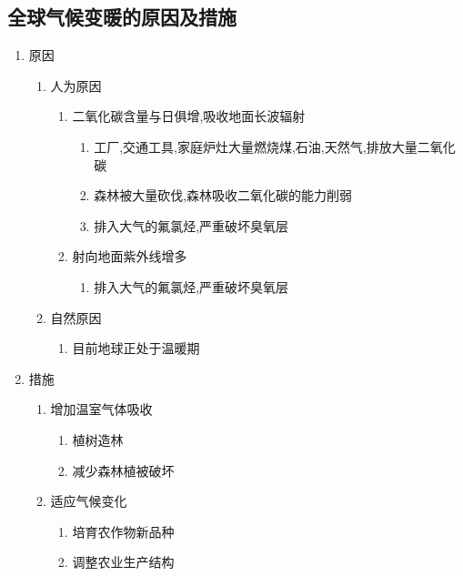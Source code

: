 \documentclass[a4paper]{article}
\begin{document}
    \subsection{全球气候变暖的原因及措施}
    \begin{enumerate}
        \item 原因
        \begin{enumerate}
            \item 人为原因
            \begin{enumerate}
                \item 二氧化碳含量与日俱增,吸收地面长波辐射
                \begin{enumerate}
                    \item 工厂,交通工具,家庭炉灶大量燃烧煤,石油,天然气,排放大量二氧化碳
                    \item 森林被大量砍伐,森林吸收二氧化碳的能力削弱
                    \item 排入大气的氟氯烃,严重破坏臭氧层
                \end{enumerate}
                \item 射向地面紫外线增多
                \begin{enumerate}
                    \item 排入大气的氟氯烃,严重破坏臭氧层
                \end{enumerate}
            \end{enumerate}
            \item 自然原因
            \begin{enumerate}
                \item 目前地球正处于温暖期
            \end{enumerate}
        \end{enumerate}
        \item 措施
        \begin{enumerate}
            \item 增加温室气体吸收
            \begin{enumerate}
                \item 植树造林
                \item 减少森林植被破坏
            \end{enumerate}
            \item 适应气候变化
            \begin{enumerate}
                \item 培育农作物新品种
                \item 调整农业生产结构

\end{enumerate}
\end{enumerate}
\end{enumerate}
\end{document}

